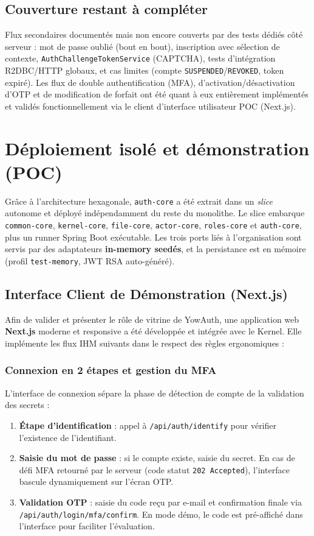 \documentclass[11pt,a4paper,oneside]{report}
\newcommand{\code}[1]{\texttt{\small #1}}
\begin{document}
\section{Couverture restant à compléter}
Flux secondaires documentés mais non encore couverts par des tests dédiés côté serveur : mot de passe
oublié (bout en bout), inscription avec sélection de contexte,
\code{AuthChallengeTokenService} (CAPTCHA), tests d'intégration R2DBC/HTTP globaux, et cas
limites (compte \code{SUSPENDED}/\code{REVOKED}, token expiré). Les flux de double authentification (MFA),
d'activation/désactivation d'OTP et de modification de forfait ont été quant à eux entièrement
implémentés et validés fonctionnellement via le client d'interface utilisateur POC (Next.js).

\chapter{Déploiement isolé et démonstration (POC)}\label{chap:poc}
Grâce à l'architecture hexagonale, \code{auth-core} a été extrait dans un \emph{slice}
autonome et déployé indépendamment du reste du monolithe. Le slice embarque
\code{common-core}, \code{kernel-core}, \code{file-core}, \code{actor-core},
\code{roles-core} et \code{auth-core}, plus un runner Spring Boot exécutable. Les trois ports
liés à l'organisation sont servis par des adaptateurs \textbf{in-memory seedés}, et la
persistance est en mémoire (profil \code{test-memory}, JWT RSA auto-généré).

\section{Interface Client de Démonstration (Next.js)}
Afin de valider et présenter le rôle de vitrine de YowAuth, une application web
\textbf{Next.js} moderne et responsive a été développée et intégrée avec le Kernel.
Elle implémente les flux IHM suivants dans le respect des règles ergonomiques :

\subsection{Connexion en 2 étapes et gestion du MFA}
L'interface de connexion sépare la phase de détection de compte de la validation des secrets :
\begin{enumerate}
  \item \textbf{Étape d'identification} : appel à \code{/api/auth/identify} pour vérifier l'existence de l'identifiant.
  \item \textbf{Saisie du mot de passe} : si le compte existe, saisie du secret. En cas de défi MFA retourné par le serveur (code statut \code{202 Accepted}), l'interface bascule dynamiquement sur l'écran OTP.
  \item \textbf{Validation OTP} : saisie du code reçu par e-mail et confirmation finale via \code{/api/auth/login/mfa/confirm}. En mode démo, le code est pré-affiché dans l'interface pour faciliter l'évaluation.
\end{enumerate}
\end{document}
